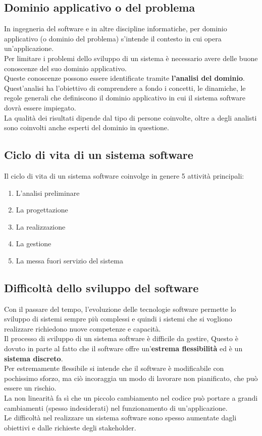 \documentclass{article}
\begin{document}
	\subsection{Dominio applicativo o del problema}
	In ingegneria del software e in altre discipline informatiche, per dominio applicativo (o dominio del problema) s'intende il contesto in cui opera un'applicazione.\\
	Per limitare i problemi dello sviluppo di un sistema è necessario avere delle buone conoscenze del suo dominio applicativo.\\
	Queste conoscenze possono essere identificate tramite \textbf{l'analisi del dominio}.\\
	Quest’analisi ha l’obiettivo di comprendere a fondo i concetti, le dinamiche, le regole generali che definiscono il dominio applicativo in cui il sistema software dovrà essere impiegato.\\
	La qualità dei risultati dipende dal tipo di persone coinvolte, oltre a degli analisti sono coinvolti anche esperti del dominio in questione.
	\subsection{Ciclo di vita di un sistema software}
	Il ciclo di vita di un sistema software coinvolge in genere 5 attività
	principali:
	\begin{enumerate}
		\item L’analisi preliminare
		\item La progettazione
		\item La realizzazione
		\item La gestione
		\item La messa fuori servizio del sistema
	\end{enumerate}
	\subsection{Difficoltà dello sviluppo del software}
	Con il passare del tempo, l’evoluzione delle tecnologie software permette lo sviluppo di sistemi sempre più complessi e quindi i sistemi che si vogliono realizzare richiedono nuove competenze e capacità.\\
	Il processo di sviluppo di un sistema software è difficile da gestire, Questo è dovuto in parte al fatto che il software offre un'\textbf{estrema flessibilità} ed è un \textbf{sistema discreto}.\\
	Per estremamente flessibile si intende che il software è modificabile con pochissimo sforzo, ma ciò incoraggia un modo di lavorare non pianificato, che può essere un rischio.\\
	La non linearità fa sì che un piccolo cambiamento nel codice può portare a grandi cambiamenti (spesso indesiderati) nel funzionamento di un’applicazione.\\
	Le difficoltà nel realizzare un sistema software sono spesso aumentate dagli obiettivi e dalle richieste degli stakeholder.
\end{document}

